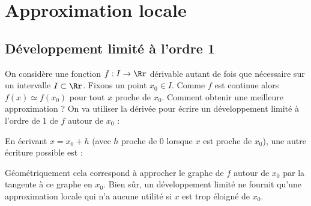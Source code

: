 \documentclass[11pt,class=report,crop=false]{standalone}
\begin{document}








\section{Approximation locale}


\subsection{Développement limité à l'ordre 1}

On considère une fonction $f : I \to \Rr$ dérivable autant de fois que nécessaire sur un intervalle $I \subset \Rr$.
Fixons un point $x_0 \in I$. Comme $f$ est continue alors $f(x) \simeq f(x_0)$ pour tout $x$ proche de $x_0$.
Comment obtenir une meilleure approximation ?
On va utiliser la dérivée pour écrire un développement limité à l'ordre de $1$ de $f$ autour de $x_0$ :

En écrivant $x = x_0+h$ (avec $h$ proche de $0$ lorsque $x$ est proche de $x_0$), une autre écriture possible est :

Géométriquement cela correspond à approcher le graphe de $f$ autour de $x_0$ par la tangente à ce graphe en $x_0$. Bien sûr, un développement limité 
ne fournit qu'une approximation locale qui n'a aucune utilité si $x$ est trop éloigné de $x_0$.
\end{document}

